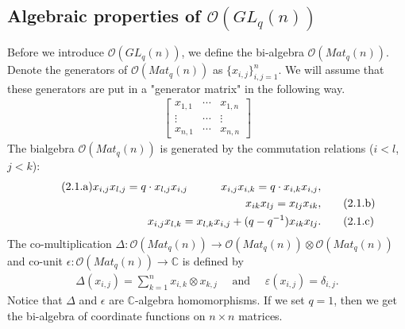 \documentclass[table,a4paper,reqno]{amsart}
\numberwithin{equation}{section}
\theoremstyle{definition}
\begin{document}
\subsection{Algebraic properties of $\mathcal{O}(GL_q(n))$}
Before we introduce $\mathcal{O}(GL_q(n))$, we define the bi-algebra $\mathcal{O}(Mat_q(n))$. Denote the generators of $\mathcal{O}(Mat_q(n))$ as $\{x_{i,j}\}_{i,j=1}^n$. We will assume that these generators are put in a "generator matrix" in the following way.
\begin{align}
    \begin{bmatrix}
    x_{1,1}&\cdots&x_{1,n}\\
    \vdots&\cdots&\vdots\\  
    x_{n,1}&\cdots&x_{n,n}
    \end{bmatrix}\tag{2.0}\label{mat:generator_n}
\end{align}
The bialgebra $\mathcal{O}(Mat_q(n))$ is generated by the commutation relations ($i<l$, $j<k$):
\begin{align}\stepcounter{equation}
    \tag{2.1.a}x_{i,j}x_{l,j}=q\cdot x_{l,j}x_{i,j}\ \ \ \ \ \ \ \ \ x_{i,j}x_{i,k}=q\cdot x_{i,k}x_{i,j},&\label{eq:2.1.a} \\
    x_{ik}x_{lj}=x_{lj}x_{ik},&\tag{2.1.b}\label{eq:2.1.b}\\
    x_{i,j}x_{l,k}=x_{l,k}x_{i,j}+(q-q^{-1})x_{ik}x_{lj}.&\tag{2.1.c}\label{eq:2.1.c}
\end{align}
The co-multiplication $\Delta:\mathcal{O}(Mat_q(n))\rightarrow \mathcal{O}(Mat_q(n))\otimes\mathcal{O}(Mat_q(n))$ and co-unit $\epsilon: \mathcal{O}(Mat_q(n))\rightarrow\mathbb{C}$ is defined by
\begin{align}
    \Delta(x_{i,j})=\sum_{k=1}^nx_{i,k}\otimes x_{k,j}\quad\text{ and }\quad\varepsilon(x_{i,j})=\delta_{i,j}.\label{eq:2.2}
\end{align}
Notice that $\Delta$ and $\epsilon$ are $\mathbb{C}$-algebra homomorphisms. If we set $q=1$, then we get the bi-algebra of coordinate functions on $n\times n$ matrices.
\end{document}
